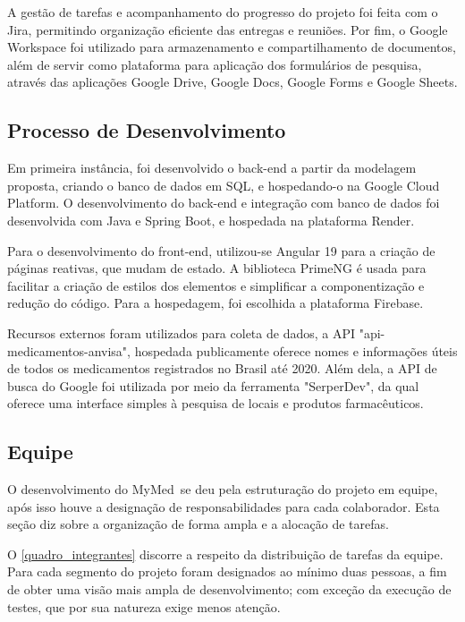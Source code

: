 \documentclass[
	article,			%
	12pt,				%
	oneside,			%
	a4paper,			%
    BIBLATEX,           %
	english,			%
	brazil,				%
	sumario=tradicional
	]{abntex2}
\newcommand\nomeprojeto{MyMed}
\begin{document}
A gestão de tarefas e acompanhamento do progresso do projeto foi feita com o Jira, permitindo organização eficiente das entregas e reuniões. Por fim, o Google Workspace foi utilizado para armazenamento e compartilhamento de documentos, além de servir como plataforma para aplicação dos formulários de pesquisa, através das aplicações Google Drive, Google Docs, Google Forms e Google Sheets.
	
\subsection{Processo de Desenvolvimento}

Em primeira instância, foi desenvolvido o back-end a partir da modelagem proposta, criando o banco de dados em SQL, e hospedando-o na Google Cloud Platform. O desenvolvimento do back-end e integração com banco de dados foi desenvolvida com Java e Spring Boot, e hospedada na plataforma Render.

Para o desenvolvimento do front-end, utilizou-se Angular 19 para a criação de páginas reativas, que mudam de estado. A biblioteca PrimeNG é usada para facilitar a criação de estilos dos elementos e simplificar a componentização e redução do código. Para a hospedagem, foi escolhida a plataforma Firebase.

Recursos externos foram utilizados para coleta de dados, a API "api-medicamentos-anvisa", hospedada publicamente oferece nomes e informações úteis de todos os medicamentos registrados no Brasil até 2020. Além dela, a API de busca do Google foi utilizada por meio da ferramenta "SerperDev", da qual oferece uma interface simples à pesquisa de locais e produtos farmacêuticos.

\subsection{Equipe}

O desenvolvimento do \nomeprojeto\ se deu pela estruturação do projeto em equipe, após isso houve a designação de responsabilidades para cada colaborador. Esta seção diz sobre a organização de forma ampla e a alocação de tarefas.

O \autoref{quadro_integrantes} discorre a respeito da distribuição de tarefas da equipe. Para cada segmento do projeto foram designados ao mínimo duas pessoas, a fim de obter uma visão mais ampla de desenvolvimento; com exceção da execução de testes, que por sua natureza exige menos atenção. 
\end{document}
